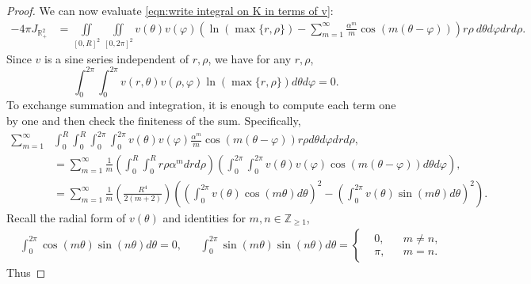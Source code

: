 \documentclass[11pt,letterpaper]{amsart}
\theoremstyle{definition}
\theoremstyle{remark}
\newcommand{\R}{\mathbb{R}}
\renewcommand{\tt}[1]{\text{#1}}
\numberwithin{equation}{section}
\begin{document}
\begin{proof}
We can now evaluate \eqref{eqn:write integral on K in terms of v}:
\begin{align*}
    -4\pi J_{\R^2_+} 
    & = \iint\limits_{[0,R]^2}\iint\limits_{[0,2\pi]^2}v(\theta)v(\varphi)\left( \ln(\max\{r,\rho\})-\sum_{m=1}^\infty \frac{\alpha^m}{m}\cos(m(\theta-\varphi)) \right)r\rho ~ d\theta d\varphi  dr d\rho.
\end{align*}
Since $v$ is a sine series independent of $r,\rho$, we have for any $r,\rho$, 
$$\int_{0}^{2\pi}\int_{0}^{2\pi} v(r,\theta)v(\rho,\varphi)\ln(\max\{r,\rho\}) d\theta d\varphi=0.$$
To exchange summation and integration, it is enough to compute each term one by one and then check the finiteness of the sum. Specifically,
\begin{align*}
    \sum_{m=1}^\infty &  \int_{0}^{R}\int_{0}^{R}\int_{0}^{2\pi}\int_{0}^{2\pi} v(\theta)v(\varphi) \frac{\alpha^m}{m}\cos(m(\theta-\varphi)) r\rho d\theta d\varphi dr d\rho , \\
    & = \sum_{m=1}^\infty \frac{1}{m} \left( \int_{0}^{R}\int_{0}^{R} r\rho \alpha^m dr d\rho \right) \left( \int_{0}^{2\pi}\int_{0}^{2\pi} v(\theta)v(\varphi)\cos(m(\theta-\varphi)) d\theta d\varphi \right) , \\
    & = \sum_{m=1}^\infty \frac{1}{m} \left( \frac{R^4}{2(m+2)} \right) \left( \left( \int_{0}^{2\pi}v(\theta)\cos(m \theta) d\theta \right)^2 - \left( \int_{0}^{2\pi}v(\theta)\sin(m \theta) d\theta \right)^2 \right).
\end{align*}
Recall the radial form of $v(\theta)$ and identities for $m,n\in \mathbb{Z}_{\geq 1}$,
\begin{align*}
    & \int_0^{2\pi}\cos(m\theta)\sin(n\theta)d\theta=0, 
    && \int_0^{2\pi}\sin(m\theta)\sin(n\theta)d\theta= 
    \left\{ \begin{aligned}
        & 0, && m\neq n, \\
        & \pi, && m=n.
    \end{aligned} \right.
\end{align*}
Thus 

\end{proof}
\end{document}
